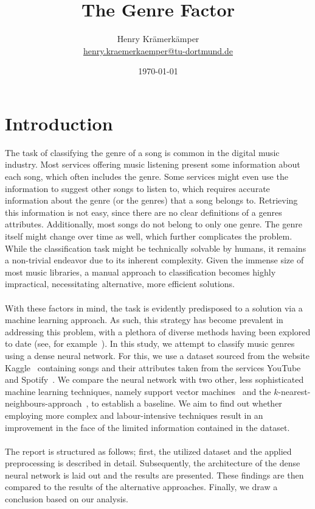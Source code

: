 \documentclass[
  12pt,
  bibliography=totoc,     %
  captions=tableheading,  %
  titlepage=firstiscover, %
]{scrartcl}
\author{%
  Henry Krämerkämper\\%
  \href{mailto:henry.kraemerkaemper@tu-dortmund.de}{henry.kraemerkaemper@tu-dortmund.de}%
}
\title{The Genre Factor}
\date{\today}
\begin{document}
\maketitle
\thispagestyle{empty}
\tableofcontents
\newpage
{}

\section{Introduction}
The task of classifying the genre of a song is common in the digital music industry. Most services
offering music listening present some information about each song, which often includes the genre.
Some services might even use the information to suggest other songs to listen to, which requires
accurate information about the genre (or the genres) that a song belongs to. Retrieving this
information is not easy, since there are no clear definitions of a genres attributes. Additionally,
most songs do not belong to only one genre. The genre itself might change over time as well, which
further complicates the problem. While the classification task might be technically solvable by humans,
it remains a non-trivial endeavor due to its inherent complexity. Given the immense size of most
music libraries, a manual approach to classification becomes highly impractical, necessitating alternative,
more efficient solutions. \\
\\
\noindent
With these factors in mind, the task is evidently predisposed to a solution via a machine learning approach.
As such, this strategy has become prevalent in addressing this problem, with a plethora of diverse methods having been explored to date
(see, for example~\cite{Übersicht2011}).
In this study, we attempt to classify music genres using a dense neural network. For this, we use a dataset sourced
from the website Kaggle~\cite{Kaggle} containing songs and their attributes taken from the services YouTube~\cite{Youtube}
and Spotify~\cite{Spotify}. We compare the neural network with two other, less sophisticated machine learning techniques,
namely support vector machines~\cite{SupportVector} and the $k$-nearest-neighbours-approach~\cite{NearestNeighbours},
to establish a baseline. We aim to find out whether employing more complex and labour-intensive techniques result in an
improvement in the face of the limited information contained in the dataset. \\
\\
\noindent
The report is structured as follows; first, the utilized dataset and the applied preprocessing is described in detail.
Subsequently, the architecture of the dense neural network is laid out and the results are presented. These findings are then
compared to the results of the alternative approaches. Finally, we draw a conclusion based on our analysis.
\end{document}
